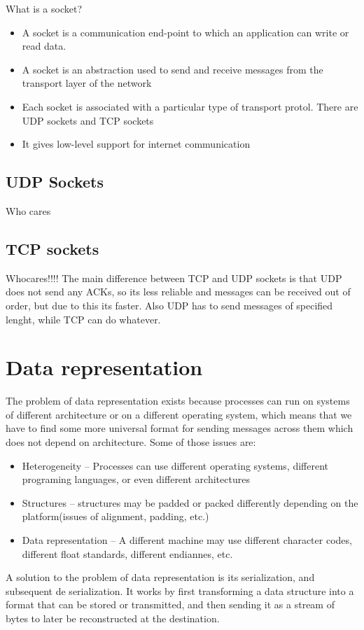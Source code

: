 {
    What is a socket? 
    \begin{itemize}
\item   A socket is a communication end-point to which an application can write or read data.
\item A socket is an abstraction used to send and receive messages from the transport layer of the network
\item Each socket is associated with a particular type of transport protol.
    There are UDP sockets and TCP sockets
\item It gives low-level support for internet communication
    \end{itemize}

}
\subsection{UDP Sockets}
Who cares
\subsection{TCP sockets}
Whocares!!!!
\nt
{
    The main difference between TCP and UDP sockets is that UDP does not send any ACKs, so its less reliable and messages can be received out of order, but due to this its faster. Also UDP has to send messages of specified lenght, while TCP can do whatever.
}

\section{Data representation}
{
    The problem of data representation exists because processes can run on systems of different architecture or on a different operating system, which means that we have to find some more universal format for sending messages across them which does not depend on architecture.
   Some of those issues are:
   \begin{itemize}
           
       \item Heterogeneity -- Processes can use different operating systems, different programing languages, or even different architectures
       \item Structures -- structures may be padded or packed differently depending on the platform(issues of alignment, padding, etc.)
       \item Data representation -- A different machine may use different character codes, different float standards, different endiannes, etc.
   \end{itemize}
}
A solution to the problem of data representation is its serialization, and subsequent de serialization. It works by first transforming a data structure into a format that can be stored or transmitted, and then sending it as a stream of bytes to later be reconstructed at the destination.

